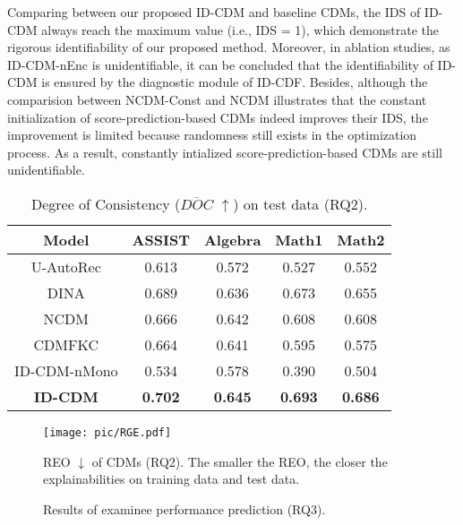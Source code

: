 \documentclass[sigconf]{acmart}
\begin{document}
\par Comparing between our proposed ID-CDM and baseline CDMs, the IDS of ID-CDM always reach the maximum value (i.e., IDS = 1), which demonstrate the rigorous identifiability of our proposed method.  Moreover, in ablation studies, as ID-CDM-nEnc is unidentifiable, it can be concluded that the identifiability of ID-CDM is ensured by the diagnostic module of ID-CDF. Besides, although the comparision between NCDM-Const and NCDM illustrates that the constant initialization of score-prediction-based CDMs indeed improves their IDS, the improvement is limited because randomness still exists in the optimization process. As a result, constantly intialized score-prediction-based CDMs are still unidentifiable.

\begin{table}[t]\centering
  \caption{Degree of Consistency ($\overline{DOC}$ $\uparrow$) on test data (RQ2).}\label{tab:doc}
  \vspace{-0.3cm}
  \begin{tabular}{ccccc}
    \toprule
    Model & ASSIST & Algebra & Math1 & Math2 \\
    \midrule
    U-AutoRec & 0.613 & 0.572 & 0.527 & 0.552 \\
    DINA & 0.689 & 0.636 & 0.673 & 0.655 \\
    NCDM & 0.666 & 0.642 & 0.608 & 0.608 \\
    CDMFKC & 0.664 & 0.641 & 0.595 & 0.575 \\
    \midrule
    ID-CDM-nMono & 0.534 & 0.578 & 0.390 & 0.504 \\
    \textbf{ID-CDM} & \textbf{0.702} & \textbf{0.645} & \textbf{0.693} & \textbf{0.686} \\
    \bottomrule 
  \end{tabular}
  \vspace{-10pt}
\end{table}

\begin{figure}[t]\centering
  \texttt{[image: pic/RGE.pdf]}
  \vspace{-5pt}
  \caption{REO $\downarrow$ of CDMs (RQ2). The smaller the REO, the closer the explainabilities on training data and test data.}\label{fig:reo}
  \vspace{-15pt}
\end{figure}

\begin{figure*}[t]
  \centering
  \vspace{-10pt}
  \caption{Results of examinee performance prediction (RQ3).}\label{fig:prediction}
  \vspace{-10pt}
\end{figure*} 
\end{document}
